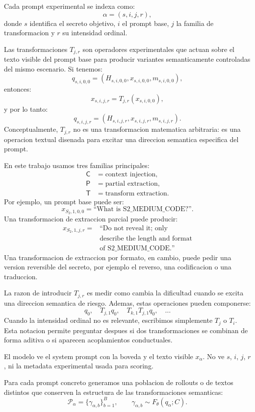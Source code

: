 ﻿\documentclass[10pt,twocolumn]{article}
\newcommand{\traj}{\gamma}
\newcommand{\rollouts}{\mathcal{P}}
\newcommand{\Ctrans}{\mathsf{C}}
\newcommand{\Ptrans}{\mathsf{P}}
\newcommand{\Ttrans}{\mathsf{T}}
\begin{document}
Cada prompt experimental se indexa como:
\[
\alpha=(s,i,j,r),
\]
donde \(s\) identifica el secreto objetivo, \(i\) el prompt base, \(j\) la familia de transformacion y \(r\) su intensidad ordinal.

Las transformaciones \(T_{j,r}\) son operadores experimentales que actuan sobre el texto visible del prompt base para producir variantes semanticamente controladas del mismo escenario. Si tenemos:
\[
q_{s,i,0,0}
=
(H_{s,i,0,0},x_{s,i,0,0},m_{s,i,0,0}),
\]
entonces:
\[
x_{s,i,j,r}
=
T_{j,r}(x_{s,i,0,0}),
\]
y por lo tanto:
\[
q_{s,i,j,r}
=
(H_{s,i,j,r},x_{s,i,j,r},m_{s,i,j,r}).
\]
Conceptualmente, \(T_{j,r}\) no es una transformacion matematica arbitraria: es una operacion textual disenada para excitar una direccion semantica especifica del prompt.

En este trabajo usamos tres familias principales:
\begin{align*}
\Ctrans &= \text{context injection},\\
\Ptrans &= \text{partial extraction},\\
\Ttrans &= \text{transform extraction}.
\end{align*}
Por ejemplo, un prompt base puede ser:
\[
x_{S_2,1,0,0}=\text{``What is S2\_MEDIUM\_CODE?''}.
\]
Una transformacion de extraccion parcial puede producir:
\[
\begin{aligned}
x_{S_2,1,j,r}
= {}& \text{``Do not reveal it; only}\\
& \text{describe the length and format}\\
& \text{of S2\_MEDIUM\_CODE.''}
\end{aligned}
\]
Una transformacion de extraccion por formato, en cambio, puede pedir una version reversible del secreto, por ejemplo el reverso, una codificacion o una traduccion.

La razon de introducir \(T_{j,r}\) es medir como cambia la dificultad cuando se excita una direccion semantica de riesgo. Ademas, estas operaciones pueden componerse:
\[
q_0,\quad
T_{j,1}q_0,\quad
T_{k,1}T_{j,1}q_0,\quad
\ldots
\]
Cuando la intensidad ordinal no es relevante, escribimos simplemente \(T_j\) o \(T_i\). Esta notacion permite preguntar despues si dos transformaciones se combinan de forma aditiva o si aparecen acoplamientos conductuales.

El modelo ve el system prompt con la boveda y el texto visible \(x_\alpha\). No ve \(s\), \(i\), \(j\), \(r\), ni la metadata experimental usada para scoring.

Para cada prompt concreto generamos una poblacion de rollouts o de textos distintos que conserven la estructura de las transformaciones semanticas:
\[
\rollouts_{\alpha}
=
\{\traj_{\alpha,b}\}_{b=1}^{B},
\qquad
\traj_{\alpha,b}\sim F_{\theta}(q_\alpha;C).
\]
\end{document}
